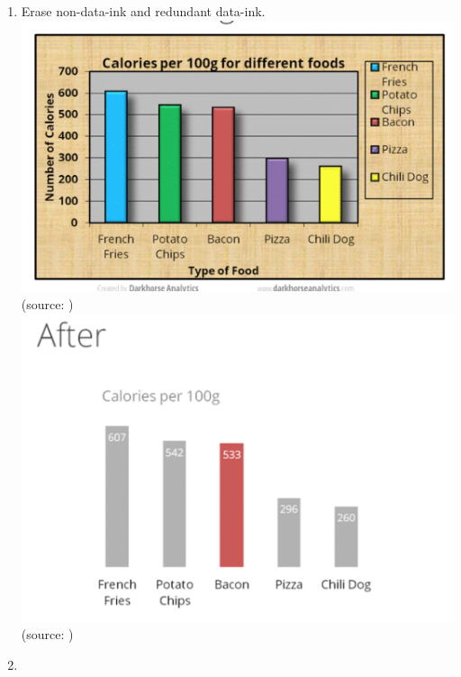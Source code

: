 \documentclass[]{book}
\theoremstyle{definition}
\theoremstyle{definition}
\theoremstyle{definition}
\theoremstyle{remark}
\begin{document}
\begin{enumerate}
\def\labelenumi{\arabic{enumi}.}
\setcounter{enumi}{1}
\item
  Erase non-data-ink and redundant data-ink.
  \includegraphics{images/Tufte_figure2.png} (source:
  \citep{appli_2017}) \includegraphics{images/Tufte_figure3.png}
  (source: \citep{appli_2017})
\item

\end{enumerate}
\end{document}
